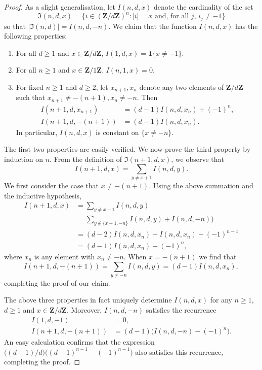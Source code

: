 \documentclass[a4paper,11pt]{article}
\numberwithin{equation}{section}
\providecommand{\abs}[1]{\lvert#1\rvert}                 %
\newcommand{\ZZ}{\mathbf{Z}} %
\theoremstyle{definition}
\begin{document}
\begin{proof}
As a slight generalisation, let $I(n,d,x)$ denote the cardinality of the set 
\begin{equation}
\mathfrak{I}(n,d,x) = 
    \{ i \in (\ZZ / d \ZZ)^{n} : \abs{i} = x \text{ and, for all $j$, } i_j \neq -1 \}
\end{equation}
so that $\abs{\mathfrak{I}(n,d)} = I(n,d,-n)$.  We claim that the function 
$I(n,d,x)$ has the following properties:
\begin{enumerate}
\item For all $d \geq 1$ and $x \in \ZZ / d \ZZ$, 
      $I(1,d,x) = \mathbf{1}\{x \neq -1\}$.
\item For all $n \geq 1$ and $x \in \ZZ / 1 \ZZ$, $I(n,1,x) = 0$.
\item For fixed $n \geq 1$ and $d \geq 2$, let $x_{n+1}, x_{n}$ 
      denote any two elements of $\ZZ / d \ZZ$ such that 
      $x_{n+1} \neq -(n+1), x_{n} \neq -n$.  Then 
      \begin{align}
      I(n+1,d,x_{n+1}) & = (d-1) I(n,d,x_n) + (-1)^n, \\
      I(n+1,d,-(n+1))  & = (d-1) I(n,d,x_n).
      \end{align}
      In particular, $I(n,d,x)$ is constant on $\{ x \neq -n \}$.
\end{enumerate}
The first two properties are easily verified.  We now prove the 
third property by induction on $n$.  From the definition of 
$\mathfrak{I}(n+1,d,x)$, we observe that 
\begin{equation}
I(n+1,d,x) = \sum_{y \neq x+1} I(n,d,y).
\end{equation}
We first consider the case that $x \neq -(n+1)$.  Using the 
above summation and the inductive hypothesis,
\begin{equation}
\begin{split}
I(n+1,d,x) & = \sum_{y \neq x+1} I(n,d,y) \\
           & = \sum_{y \not \in \{ x+1, -n \}} I(n,d,y) + I(n,d,-n)) \\
           & = (d - 2) I(n,d,x_{n}) + I(n,d,x_n) - (-1)^{n-1} \\
           & = (d - 1) I(n,d,x_{n}) + (-1)^n,
\end{split}
\end{equation}
where $x_n$ is any element with $x_n \neq -n$.  When $x = -(n+1)$ 
we find that 
\begin{equation}
I(n+1,d,-(n+1)) = \sum_{y \neq -n} I(n,d,y) = (d-1) I(n,d,x_{n}),
\end{equation}
completing the proof of our claim.

The above three properties in fact uniquely determine $I(n,d,x)$ 
for any $n \geq 1$, $d \geq 1$ and $x \in \ZZ / d \ZZ$.  Moreover, 
$I(n,d,-n)$ satisfies the recurrence 
\begin{align}
I(1,d,-1) & = 0, \\
I(n+1,d,-(n+1)) & = (d-1) \bigl( I(n,d,-n) - (-1)^n \bigr).
\end{align}
An easy calculation confirms that the expression 
$\bigl( (d-1)/d \bigr) \bigl( (d-1)^{n-1} - (-1)^{n-1} \bigr)$ also 
satisfies this recurrence, completing the proof.
\end{proof}
\end{document}
